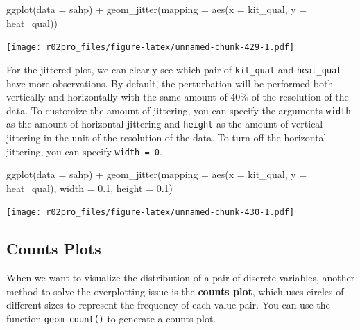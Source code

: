 \documentclass[
]{book}
\newenvironment{Shaded}{\begin{snugshade}}{\end{snugshade}}
\newcommand{\AttributeTok}[1]{\textcolor[rgb]{0.77,0.63,0.00}{#1}}
\newcommand{\FloatTok}[1]{\textcolor[rgb]{0.00,0.00,0.81}{#1}}
\newcommand{\FunctionTok}[1]{\textcolor[rgb]{0.00,0.00,0.00}{#1}}
\newcommand{\NormalTok}[1]{#1}
\newcommand{\SpecialCharTok}[1]{\textcolor[rgb]{0.00,0.00,0.00}{#1}}
\begin{document}
\begin{Shaded}
\begin{Highlighting}[]
\FunctionTok{ggplot}\NormalTok{(}\AttributeTok{data =}\NormalTok{ sahp) }\SpecialCharTok{+} \FunctionTok{geom\_jitter}\NormalTok{(}\AttributeTok{mapping =} \FunctionTok{aes}\NormalTok{(}\AttributeTok{x =}\NormalTok{ kit\_qual, }\AttributeTok{y =}\NormalTok{ heat\_qual))}
\end{Highlighting}
\end{Shaded}

\texttt{[image: r02pro\_files/figure-latex/unnamed-chunk-429-1.pdf]}

For the jittered plot, we can clearly see which pair of \texttt{kit\_qual} and \texttt{heat\_qual} have more observations. By default, the perturbation will be performed both vertically and horizontally with the same amount of 40\% of the resolution of the data. To customize the amount of jittering, you can specify the arguments \texttt{width} as the amount of horizontal jittering and \texttt{height} as the amount of vertical jittering in the unit of the resolution of the data. To turn off the horizontal jittering, you can specify \texttt{width\ =\ 0}.

\begin{Shaded}
\begin{Highlighting}[]
\FunctionTok{ggplot}\NormalTok{(}\AttributeTok{data =}\NormalTok{ sahp) }\SpecialCharTok{+} \FunctionTok{geom\_jitter}\NormalTok{(}\AttributeTok{mapping =} \FunctionTok{aes}\NormalTok{(}\AttributeTok{x =}\NormalTok{ kit\_qual, }\AttributeTok{y =}\NormalTok{ heat\_qual),  }\AttributeTok{width =} \FloatTok{0.1}\NormalTok{, }\AttributeTok{height =} \FloatTok{0.1}\NormalTok{)}
\end{Highlighting}
\end{Shaded}

\texttt{[image: r02pro\_files/figure-latex/unnamed-chunk-430-1.pdf]}

\hypertarget{count}{%
\subsection{Counts Plots}\label{count}}

When we want to visualize the distribution of a pair of discrete variables, another method to solve the overplotting issue is the \textbf{counts plot}, which uses circles of different sizes to represent the frequency of each value pair. You can use the function \texttt{geom\_count()} to generate a counts plot.
\end{document}
